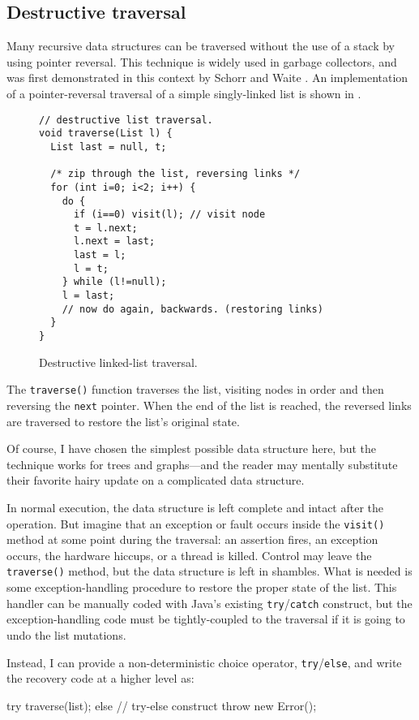 \subsection{Destructive traversal}\label{sec:destruct}
Many recursive data structures can be traversed without the use of a
stack by using pointer reversal.  This technique is widely used in
garbage collectors, and was first demonstrated in this context by
Schorr and Waite \cite{SchorrWa67}.  An implementation of a
pointer-reversal traversal of a simple singly-linked list is shown in
.
\begin{figure}\sis\fontsize{9}{10}\begin{verbatim}
// destructive list traversal.
void traverse(List l) {
  List last = null, t;
  
  /* zip through the list, reversing links */
  for (int i=0; i<2; i++) {
    do {
      if (i==0) visit(l); // visit node
      t = l.next;
      l.next = last;
      last = l;
      l = t;
    } while (l!=null);
    l = last;
    // now do again, backwards. (restoring links)
  }
}
\end{verbatim}
\caption{Destructive linked-list traversal.}
\label{fig:destruct-list}
\end{figure}

The \texttt{traverse()} function traverses the list, visiting nodes in
order and then reversing the {\tt next} pointer.  When the end of the
list is reached, the reversed links are traversed to restore the
list's original state.

Of course, I have chosen the simplest possible data structure here, but
the technique works for trees and graphs---and the reader may mentally
substitute their favorite hairy update on a complicated data
structure.

In normal execution, the data structure is left complete and intact
after the operation.  But
imagine that an exception or fault occurs inside the {\tt visit()} method
at some point during the traversal: an assertion fires, an exception
occurs, the hardware hiccups, or a thread is killed.  Control may
leave the {\tt traverse()} method, but the data structure is left in
shambles.  What is needed is some exception-handling procedure to
restore the proper state of the list.  This handler can be manually coded with
Java's existing {\tt try}/{\tt catch} construct, but the
exception-handling code must be tightly-coupled to the traversal if it
is going to undo the list mutations.

Instead, I can provide a non-deterministic choice operator,
{\tt try}/{\tt else}, and write the recovery code at a higher level as:
\begin{inlinecode}
try {
  traverse(list);
} else { // try-else construct
  throw new Error();
}
\end{inlinecode}

